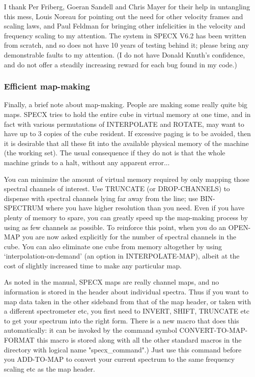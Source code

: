 \documentclass[twoside,11pt,nolof]{starlink}
\begin{document}
I thank Per Friberg, Goeran Sandell and Chris Mayer for their help in
untangling this mess, Louis Noreau for pointing out the need for other
velocity frames and scaling laws, and Paul Feldman for bringing other
infelicities in the velocity and frequency scaling to my attention. The system
in SPECX V6.2 has been written from scratch, and so does not have 10 years of
testing behind it; please bring any demonstrable faults to my attention. (I do
not have Donald Knuth's confidence, and do not offer a steadily increasing
reward for each bug found in my code.)

\subsubsection{Efficient map-making}

Finally, a brief note about map-making. People are making some really quite
big maps. SPECX tries to hold the entire cube in virtual memory at one time,
and in fact with various permutations of INTERPOLATE and ROTATE, may want to
have up to 3 copies of the cube resident. If excessive paging is to be
avoided, then it is desirable that all these fit into the available physical
memory of the machine (the working set). The usual consequence if they do not
is that the whole machine grinds to a halt, without any apparent error...

You can minimize the amount of virtual memory required by only mapping those
spectral channels of interest. Use TRUNCATE (or DROP-CHANNELS) to dispense
with spectral channels lying far away from the line; use BIN-SPECTRUM where
you have higher resolution than you need. Even if you have plenty of memory to
spare, you can greatly speed up the map-making process by using as few
channels as possible. To reinforce this point, when you do an OPEN-MAP you are
now asked explicitly for the number of spectral channels in the cube. You can
also eliminate one cube from memory altogether by using
`interpolation-on-demand' (an option in INTERPOLATE-MAP), albeit at the cost
of slightly increased time to make any particular map.

As noted in the manual, SPECX maps are really channel maps, and no information
is stored in the header about individual spectra. Thus if you want to map data
taken in the other sideband from that of the map header, or taken with a
different spectrometer etc, you first need to INVERT, SHIFT, TRUNCATE etc to
get your spectrum into the right form. There is a new macro that does this
automatically: it can be invoked by the command symbol CONVERT-TO-MAP-FORMAT
this macro is stored along with all the other standard macros in the directory
with logical name "specx\_command".) Just use this command before you
ADD-TO-MAP to convert your current spectrum to the same frequency scaling etc
as the map header.
\end{document}
